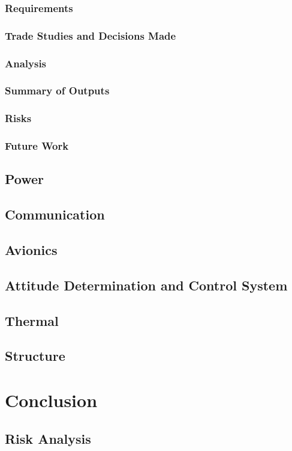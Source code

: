 \documentclass[12pt]{article}
\begin{document}
			\subsubsection{Requirements}
			\subsubsection{Trade Studies and Decisions Made}
			\subsubsection{Analysis}
			\subsubsection{Summary of Outputs}
			\subsubsection{Risks}
			\subsubsection{Future Work}
		\subsection{Power}
		\subsection{Communication}
		\subsection{Avionics}
		\subsection{Attitude Determination and Control System}
		\subsection{Thermal}
		\subsection{Structure}
\section{Conclusion}
		\subsection{Risk Analysis}
\end{document}
